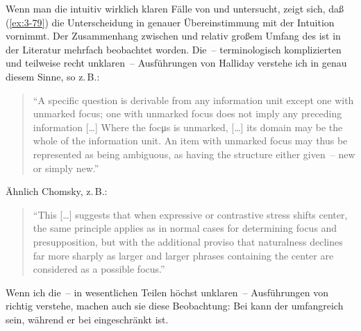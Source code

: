\documentclass[output=paper]{langsci/langscibook}
\begin{document}
Wenn man die intuitiv wirklich klaren Fälle von  und
  untersucht, zeigt sich, daß (\ref{ex:3-79}) die
Unterscheidung in genauer Übereinstimmung mit der Intuition
vornimmt. Der Zusammenhang zwischen  und
relativ großem Umfang des  ist in der Literatur mehrfach
beobachtet worden. Die~-- terminologisch komplizierten und teilweise
recht unklaren~-- Ausführungen von Halliday verstehe ich in genau
diesem Sinne, so z.\,B.:
\begin{quotation}
  "`A specific question is derivable from any information unit except
  one with unmarked focus; one with unmarked focus does not imply any
  preceding information [\ldots] Where the focμs is unmarked, [\ldots]
  its domain may be the whole of the information unit. An item with
  unmarked focus may thus be represented as being ambiguous, as having
  the structure either given~-- new or simply new."'
  \citep[208]{Halliday67}
\end{quotation}
Ähnlich Chomsky, z.\,B.:
\begin{quotation}
  "`This [\ldots] suggests that when expressive or contrastive stress
  shifts  center, the same principle applies as in normal
  cases for determining focus and presupposition, but with the
  additional proviso that naturalness declines far more sharply as
  larger and larger phrases containing the  center are
  considered as a possible focus."' \citep[98f]{Chomsky76a}
\end{quotation}
Wenn ich die~-- in wesentlichen Teilen höchst unklaren~-- Ausführungen
von \citet{Sgall73} richtig verstehe, machen auch sie diese
Beobachtung: Bei   kann der  umfangreich
sein, während er bei   eingeschränkt
ist.
\end{document}
